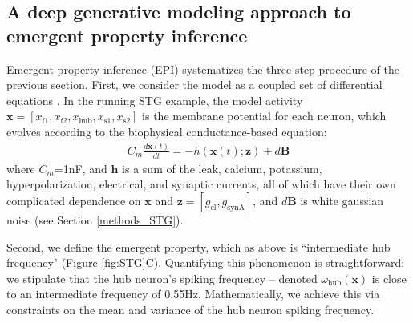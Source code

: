 \documentclass[11pt]{article}
\begin{document}
\subsection{A deep generative modeling approach to emergent property inference} \label{results_dgm}
Emergent property inference (EPI) systematizes the three-step procedure of the previous section.
First, we consider the model as a coupled set of differential equations \cite{gutierrez2013multiple}.  
In the running STG example, the model activity $\mathbf{x} = \left[ x_{\text{f1}}, x_{\text{f2}}, x_{\text{hub}}, x_{\text{s1}}, x_{\text{s2}} \right]$ is the membrane potential for each neuron, which evolves according to the biophysical conductance-based equation:
\begin{equation} 
\begin{split}
C_m \frac{d\mathbf{x}(t)}{dt} = -h(\mathbf{x}(t); \mathbf{z}) + d\mathbf{B}
 \end{split}
\end{equation} 
where $C_m$=1nF, and $\mathbf{h}$ is a sum of the leak, calcium, potassium, hyperpolarization, electrical, and synaptic currents, all of which have their own complicated dependence on $\mathbf{x}$ and $\mathbf{z} = [g_{\text{el}}, g_{\text{synA}}]$, and $d\mathbf{B}$ is white gaussian noise (see Section \ref{methods_STG}).

Second, we define the emergent property, which as above is ``intermediate hub  frequency" (Figure \ref{fig:STG}C).
Quantifying this phenomenon is straightforward: we stipulate that the hub neuron's spiking frequency -- denoted $\omega_{\text{hub}}(\mathbf{x})$ is close to an intermediate frequency of 0.55Hz.  
Mathematically, we achieve this via constraints on the mean and variance of the hub neuron spiking frequency.
\end{document}
